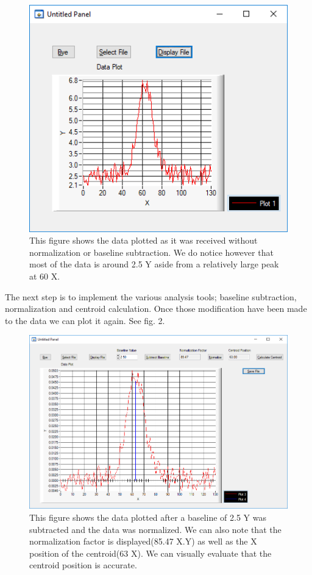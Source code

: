 \documentclass{article}
\begin{document}
\begin{figure}[h!]
\includegraphics{Lab1_1.png}
\caption{This figure shows the data plotted as it was received without normalization or baseline subtraction.  We do notice however that most of the data is around 2.5 Y aside from a relatively large peak at 60 X.}
\end{figure}

The next step is to implement the various analysis tools;  baseline subtraction, normalization and centroid calculation.  Once those modification have been made to the data we can plot it again.  See fig. 2.
\\

\begin{figure}[h!]
\includegraphics[scale=.475]{Lab1_2.png}
\caption{This figure shows the data plotted after a baseline of 2.5 Y was subtracted and the data was normalized.  We can also note that the normalization factor is displayed(85.47 X.Y) as well as the X position of the centroid(63 X). We can visually evaluate that the centroid position is accurate.}
\end{figure}
\end{document}
